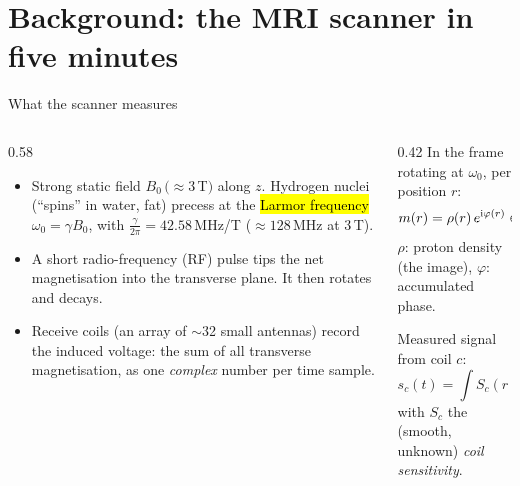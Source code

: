 \section{Background: the MRI scanner in five minutes}

\begin{frame}{What the scanner measures}
\begin{columns}[T]
\begin{column}{0.58\textwidth}
\begin{itemize}
\item Strong static field $B_0\,(\approx3$\,T$)$ along $z$. Hydrogen nuclei (``spins'' in water, fat) precess at the \hl{Larmor frequency}
$\omega_0=\gamma B_0$, with $\tfrac{\gamma}{2\pi}=42.58$\,MHz/T ($\approx128$\,MHz at 3\,T).
\item A short radio-frequency (RF) pulse tips the net magnetisation into the transverse plane. It then rotates and decays.
\item Receive coils (an array of $\sim$32 small antennas) record the induced voltage: the sum of all transverse magnetisation, as one \emph{complex} number per time sample.
\end{itemize}
\end{column}
\begin{column}{0.42\textwidth}
\small
In the frame rotating at $\omega_0$, per position $r$:
\[ m(r)=\rho(r)\,e^{\mathrm i\varphi(r)}\in\mathbb C \]
$\rho$: proton density (the image), $\varphi$: accumulated phase.
\medskip

Measured signal from coil $c$:
\[ s_c(t)=\int S_c(r)\,m(r,t)\,dr \]
with $S_c$ the (smooth, unknown) \emph{coil sensitivity}.
\end{column}
\end{columns}
\end{frame}


